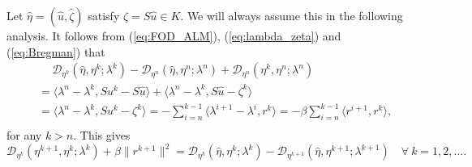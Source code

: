 \documentclass[leqno]{amsart}
\theoremstyle{definition}
\begin{document}
Let $\hat{\eta} = (\hat{u}, \hat{\zeta})$ satisfy $\hat{\zeta} = S\hat{u} \in K$. We will always assume this in the following analysis. It follows from (\ref{eq:FOD_ALM}), (\ref{eq:lambda_zeta}) and (\ref{eq:Bregman}) that 
\begin{equation}\label{eq:Breg_lu}
\begin{aligned}
&\quad\ \mathcal{D}_{\eta^{k}}(\hat{\eta},\eta^{k}; \lambda^{k}) - \mathcal{D}_{\eta^{n}}(\hat{\eta},\eta^{n}; \lambda^{n}) + \mathcal{D}_{\eta^{n}}(\eta^{k},\eta^{n}; \lambda^{n})\\
& = \langle \lambda^n - \lambda^{k}, Su^{k} - S\hat{u}\rangle+ \langle  \lambda^n - \lambda^{k}, S\hat{u} - \zeta^{k}\rangle\\
& = \langle \lambda^n - \lambda^{k}, Su^{k} - \zeta^{k}\rangle 
= -\sum\limits_{i = n}^{k-1}\langle \lambda^{i+1} - \lambda^{i}, r^{k}\rangle
= -\beta\sum\limits_{i = n}^{k-1}\langle r^{i+1}, r^k\rangle,\\
\end{aligned}
\end{equation}
for any $k>n$. 
This gives
$$ \mathcal{D}_{\eta^{k}}(\eta^{k+1},\eta^{k}; \lambda^{k}) + \beta\|r^{k+1}\|^2  = \mathcal{D}_{\eta^{k}}(\hat{\eta},\eta^{k}; \lambda^{k}) - \mathcal{D}_{\eta^{k+1}}(\hat{\eta},\eta^{k+1}; \lambda^{k+1})\quad \forall\ k = 1, 2, \dots.$$
\end{document}
